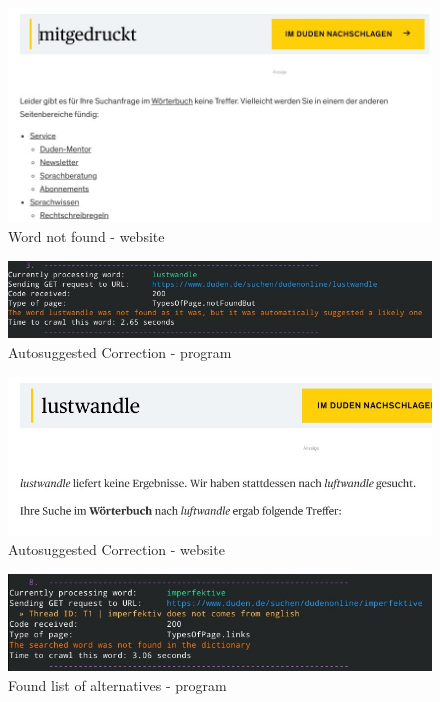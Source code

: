 \documentclass{article}
\begin{document}
\begin{figure}[h]
	\caption{Word not found - website}
	\centering
	\includegraphics[scale=0.5]{2}
\end{figure}


\begin{figure}[h]
	\caption{Autosuggested Correction - program}
	\centering
	\includegraphics[scale=0.5]{3}
\end{figure}

\begin{figure}[h]
	\caption{Autosuggested Correction - website}
	\centering
	\includegraphics[scale=0.5]{4}
\end{figure}


\begin{figure}[h]
	\caption{Found list of alternatives - program}
	\centering
	\includegraphics[scale=0.5]{5}
\end{figure}
\end{document}
